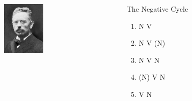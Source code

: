 \documentclass[compress]{beamer}
\begin{document}
% 
% 
% 
% 
% 


\begin{frame}
\frametitle{\cite{jespersen:1917}}
\begin{columns}[T]  
   \begin{column}{.2\textwidth}
 	  \vspace{10pt}
	  \includegraphics[height=1in]{jespersen.jpg}   
   \end{column}
   \begin{column}{.8\textwidth}
      \begin{block}{The Negative Cycle}
	\begin{enumerate}
	     \item N V
	     \item N V (N)
	     \item N V N
	     \item (N) V N
	     \item V N
	\end{enumerate}
      \end{block}
    \end{column}
  \end{columns}
\end{frame}
\end{document}
